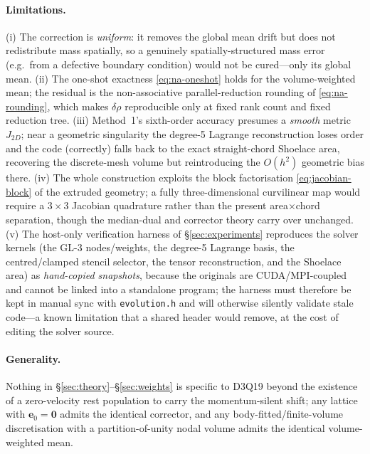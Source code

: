\documentclass[11pt]{article}
\theoremstyle{definition}
\theoremstyle{remark}
\providecommand{\path}[1]{\texttt{#1}}
\begin{document}
\paragraph{Limitations.}
(i) The correction is \emph{uniform}: it removes the global mean drift but does not
redistribute mass spatially, so a genuinely spatially-structured mass error (e.g.\
from a defective boundary condition) would not be cured---only its global mean. (ii)
The one-shot exactness \eqref{eq:na-oneshot} holds for the volume-weighted mean; the
residual is the non-associative parallel-reduction rounding of
\eqref{eq:na-rounding}, which makes $\delta\rho$ reproducible only at fixed rank
count and fixed reduction tree. (iii) Method~1's sixth-order accuracy presumes a
\emph{smooth} metric $J_{2D}$; near a geometric singularity the degree-5 Lagrange
reconstruction loses order and the code (correctly) falls back to the exact
straight-chord Shoelace area, recovering the discrete-mesh volume but reintroducing
the $O(h^2)$ geometric bias there. (iv) The whole construction exploits the block
factorisation \eqref{eq:jacobian-block} of the extruded geometry; a fully
three-dimensional curvilinear map would require a $3\times3$ Jacobian quadrature
rather than the present area$\times$chord separation, though the median-dual and
corrector theory carry over unchanged. (v) The host-only verification harness of
\S\ref{sec:experiments} reproduces the solver kernels (the GL-3 nodes/weights, the
degree-5 Lagrange basis, the centred/clamped stencil selector, the tensor
reconstruction, and the Shoelace area) as \emph{hand-copied snapshots}, because the
originals are CUDA/MPI-coupled and cannot be linked into a standalone program; the
harness must therefore be kept in manual sync with \path{evolution.h} and will
otherwise silently validate stale code---a known limitation that a shared header
would remove, at the cost of editing the solver source.

\paragraph{Generality.}
Nothing in \S\ref{sec:theory}--\S\ref{sec:weights} is specific to D3Q19 beyond the
existence of a zero-velocity rest population to carry the momentum-silent shift; any
lattice with $\mathbf e_0=\mathbf0$ admits the identical corrector, and any
body-fitted/finite-volume discretisation with a partition-of-unity nodal volume
admits the identical volume-weighted mean.

\end{document}
